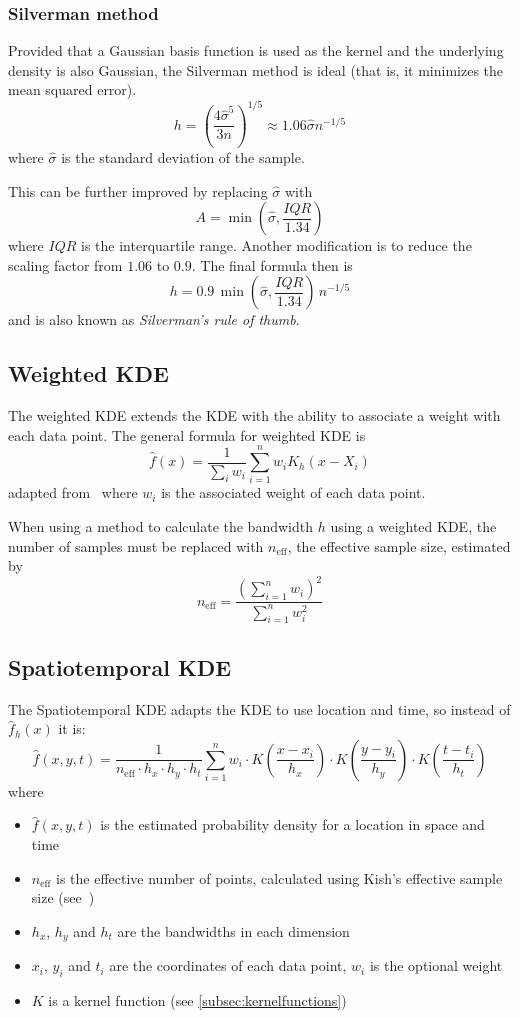 \subsubsection{Silverman method}

Provided that a Gaussian basis function is used as the kernel and the underlying density is also Gaussian, the Silverman method is ideal (that is, it minimizes the mean squared error).
\[
h={\left(\frac{4\hat{\sigma}^5}{3n}\right)}^{1/5}\approx 1.06\hat{\sigma}n^{-1/5}
\]
where $\hat{\sigma}$ is the standard deviation of the sample.

This can be further improved by replacing $\hat{\sigma}$ with
\[
A=\min\left(\hat{\sigma}, \frac{IQR}{1.34}\right)
\]
where $IQR$ is the interquartile range. Another modification is to reduce the scaling factor from $1.06$ to $0.9$. The final formula then is
\[
h=0.9\,\min\left(\hat{\sigma}, \frac{IQR}{1.34}\right)\,n^{-1/5}
\]
and is also known as \emph{Silverman's rule of thumb}.\ \cite{kde:book2}

\subsection{Weighted KDE}

The weighted KDE extends the KDE with the ability to associate a weight with each data point. The general formula for weighted KDE is
\[
\hat{f}(x)=\frac{1}{\sum_i w_i}\sum_{i=1}^n w_{i} K_{h}(x-X_{i})
\]
adapted from\ \cite{kde:weighted01} where $w_i$ is the associated weight of each data point.

When using a method to calculate the bandwidth $h$ using a weighted KDE, the number of samples must be replaced with $n_\mathrm{eff}$, the effective sample size, estimated by
\[
n_\mathrm{eff}=\frac{{\left(\sum_{i=1}^n w_i\right)}^2}{\sum_{i=1}^n w_i^2}
\]
\nolinebreak\cite{kde:book3}

\subsection{Spatiotemporal KDE}

The Spatiotemporal KDE adapts the KDE to use location and time, so instead of $\hat{f}_h(x)$ it is:
\[
\hat{f}(x,y,t)=\frac{1}{n_\mathrm{eff}\cdot h_{x}\cdot h_{y}\cdot h_{t}}\sum_{i=1}^n w_{i}\cdot K\left( \frac{x-x_{i}}{h_{x}} \right)\cdot K\left( \frac{y-y_{i}}{h_{y}} \right)\cdot K\left( \frac{t-t_{i}}{h_{t}} \right)
\]
where
\begin{itemize}
    \item $\hat{f}(x,y,t)$ is the estimated probability density for a location in space and time
    \item $n_\mathrm{eff}$ is the effective number of points, calculated using Kish's effective sample size (see\ \cite{kde:book3})
    \item $h_x$, $h_y$ and $h_t$ are the bandwidths in each dimension
    \item $x_i$, $y_i$ and $t_i$ are the coordinates of each data point, $w_i$ is the optional weight
    \item $K$ is a kernel function (see \autoref{subsec:kernelfunctions})
\end{itemize}


